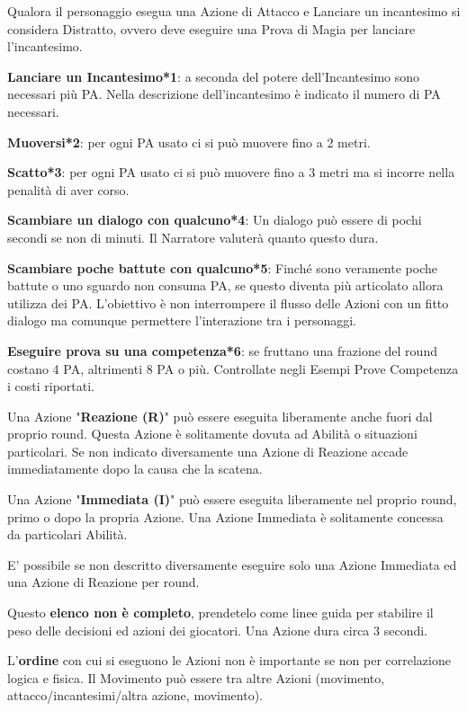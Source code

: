 \documentclass[12pt,a4paper,twoside,openany]{book}
\begin{document}
Qualora il personaggio esegua una Azione di Attacco e Lanciare un incantesimo si considera Distratto, ovvero deve eseguire una Prova di Magia per lanciare l'incantesimo.

\begin{multicols}{2}
	


\textbf{Lanciare un Incantesimo*1}: a seconda del potere dell'Incantesimo sono necessari più PA. Nella descrizione dell'incantesimo è indicato il numero di PA necessari. 

\textbf{Muoversi*2}: per ogni PA usato ci si può muovere fino a 2 metri.

\textbf{Scatto*3}: per ogni PA usato ci si può muovere fino a 3 metri ma si incorre nella penalità di aver corso.

\textbf{Scambiare un dialogo con qualcuno*4}: Un dialogo può essere di pochi secondi se non di minuti. Il Narratore valuterà quanto questo dura.

\textbf{Scambiare poche battute con qualcuno*5}: Finché sono veramente poche battute o uno sguardo non consuma PA, se questo diventa più articolato allora utilizza dei PA. L'obiettivo è non interrompere il flusso delle Azioni con un fitto dialogo ma comunque permettere l'interazione tra i personaggi.

\textbf{Eseguire prova su una competenza*6}: se fruttano una frazione del round costano 4 PA, altrimenti 8 PA o più. Controllate negli Esempi Prove Competenza i costi riportati.

Una Azione "\textbf{Reazione (R)}" può essere eseguita liberamente anche fuori dal proprio round. Questa Azione è solitamente dovuta ad Abilità o situazioni particolari. Se non indicato diversamente una Azione di Reazione accade immediatamente dopo la causa che la scatena.

Una Azione "\textbf{Immediata (I)}" può essere eseguita liberamente nel proprio round, primo o dopo la propria Azione. Una Azione Immediata è solitamente concessa da particolari Abilità.

E' possibile se non descritto diversamente eseguire solo una Azione Immediata ed una Azione di Reazione per round.

\medskip

Questo \textbf{elenco non è completo}, prendetelo come linee guida per stabilire il peso delle decisioni ed azioni dei giocatori. Una Azione dura circa 3 secondi.

L'\textbf{ordine} con cui si eseguono le Azioni non è importante se non per correlazione logica e fisica. Il Movimento può essere tra altre Azioni (movimento, attacco/incantesimi/altra azione, movimento).


\end{multicols}
\end{document}
